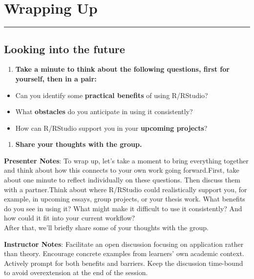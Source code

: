 \documentclass[
  letterpaper,
  DIV=11,
  numbers=noendperiod]{scrartcl}
\providecommand{\tightlist}{%
  \setlength{\itemsep}{0pt}\setlength{\parskip}{0pt}}
\begin{document}
\section{Wrapping Up}\label{wrapping-up}

\begin{center}\rule{0.5\linewidth}{0.5pt}\end{center}

\subsection{Looking into the future}\label{looking-into-the-future}

\begin{enumerate}
\def\labelenumi{\arabic{enumi}.}
\tightlist
\item
  \textbf{Take a minute to think about the following questions, first
  for yourself, then in a pair:}
\end{enumerate}

\begin{itemize}
\item
  Can you identify some \textbf{practical benefits} of using R/RStudio?
\item
  What \textbf{obstacles} do you anticipate in using it consistently?
\item
  How can R/RStudio support you in your \textbf{upcoming projects}?
\end{itemize}

\begin{enumerate}
\def\labelenumi{\arabic{enumi}.}
\setcounter{enumi}{1}
\tightlist
\item
  \textbf{Share your thoughts with the group.}
\end{enumerate}

\textbf{Presenter Notes}: To wrap up, let's take a moment to bring
everything together and think about how this connects to your own work
going forward.First, take about one minute to reflect individually on
these questions. Then discuss them with a partner.Think about where
R/RStudio could realistically support you, for example, in upcoming
essays, group projects, or your thesis work. What benefits do you see in
using it? What might make it difficult to use it consistently? And how
could it fit into your current workflow?\\
After that, we'll briefly share some of your thoughts with the group.

\textbf{Instructor Notes}: Facilitate an open discussion focusing on
application rather than theory. Encourage concrete examples from
learners' own academic context. Actively prompt for both benefits and
barriers. Keep the discussion time-bound to avoid overextension at the
end of the session.
\end{document}
